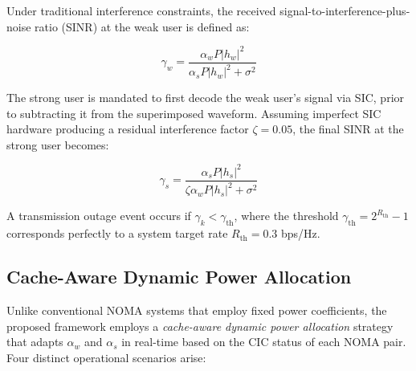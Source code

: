 \documentclass[conference]{IEEEtran}
\begin{document}
Under traditional interference constraints, the received signal-to-interference-plus-noise ratio (SINR) at the weak user is defined as:

\begin{equation}
\gamma_w = \frac{\alpha_w P |h_w|^2}{\alpha_s P |h_w|^2 + \sigma^2}
\label{eq:sinr_weak}
\end{equation}

The strong user is mandated to first decode the weak user's signal via SIC, prior to subtracting it from the superimposed waveform. Assuming imperfect SIC hardware producing a residual interference factor $\zeta = 0.05$, the final SINR at the strong user becomes:

\begin{equation}
\gamma_s = \frac{\alpha_s P |h_s|^2}{\zeta \alpha_w P |h_s|^2 + \sigma^2}
\label{eq:sinr_strong}
\end{equation}

A transmission outage event occurs if $\gamma_k < \gamma_{\text{th}}$, where the threshold $\gamma_{\text{th}} = 2^{R_{\text{th}}} - 1$ corresponds perfectly to a system target rate $R_{\text{th}} = 0.3$ bps/Hz.

\subsection{Cache-Aware Dynamic Power Allocation}
Unlike conventional NOMA systems that employ fixed power coefficients, the proposed framework employs a \textit{cache-aware dynamic power allocation} strategy that adapts $\alpha_w$ and $\alpha_s$ in real-time based on the CIC status of each NOMA pair. Four distinct operational scenarios arise:
\end{document}
